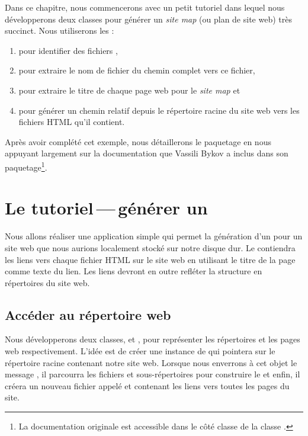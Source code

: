 \documentclass[a4paper,10pt,twoside]{book}
\begin{document}
Dans ce chapitre, nous commencerons avec un petit tutoriel dans lequel
nous développerons deux classes pour générer un \emph{site map} (ou
plan de site web) très succinct.
Nous utiliserons les \expregs:
\begin{enumerate}
\item pour identifier des fichiers ,
\item pour extraire
le nom de fichier du chemin complet vers ce fichier, 
\item pour extraire le titre de chaque page web pour le \emph{site
    map} et
\item pour générer un chemin relatif depuis le répertoire racine du
  site web vers les fichiers HTML qu'il contient.
\end{enumerate}
Après avoir complété cet exemple, nous détaillerons le paquetage
\pkgregex en nous appuyant largement sur la documentation que Vassili
Bykov a inclus dans son paquetage\footnote{La documentation originale
  est accessible dans le côté classe de la classe .}.

\section{Le tutoriel\,---\,générer un \sitemap}


Nous allons réaliser une application simple qui permet la génération
d'un \sitemap pour un site web que nous aurions localement stocké sur
notre disque dur. Le \sitemap contiendra les liens vers chaque fichier
HTML sur le site web en utilisant le titre de la page comme texte du
lien. Les liens devront en outre refléter la structure en répertoires
du site web.

\subsection{Accéder au répertoire web}


Nous développerons deux classes,  et , pour
représenter les répertoires et les pages web respectivement. L'idée
est de créer une instance de  qui pointera sur le
répertoire racine contenant notre site web. Lorsque nous enverrons à
cet objet le message , il parcourra les fichiers et
sous-répertoires pour construire le \sitemap et enfin, il créera un
nouveau fichier appelé  et contenant les liens vers
toutes les pages du site.
\end{document}
